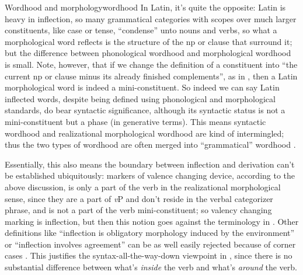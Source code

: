 \documentclass[a4paper, oneside]{report}
\newcommand*{\citesec}[1]{\S~{#1}}
\newcommand{\vP}{\textit{v}P}
\begin{document}
\begin{theorybox}{Wordhood and morphology}{wordhood}
    In Latin, it's quite the opposite: 
    Latin is heavy in inflection, 
    so many grammatical categories with scopes over much larger constituents, 
    like case or tense, 
    ``condense'' unto nouns and verbs, 
    so what a morphological word reflects 
    is the structure of the \acs{np} or clause that surround it;
    but the difference between phonological wordhood 
    and morphological wordhood is small. 
    Note, however, that if we change the definition of a constituent 
    into ``the current \acs{np} or clause minus its already finished complements'',
    as in ,
    then a Latin morphological word is indeed a mini-constituent.
    So indeed we can say Latin inflected words,
    despite being defined using phonological and morphological standards,
    do bear syntactic significance,
    although its syntactic status 
    is not a mini-constituent but a phase (in generative terms).
    This means syntactic wordhood and realizational morphological wordhood
    are kind of intermingled;
    thus the two types of wordhood are often 
    merged into ``grammatical'' wordhood \citet[\citesec{10.4}]{dixon2010basic2}. 

    Essentially, this also means the boundary between inflection and derivation 
    can't be established ubiquitously:
    markers of valence changing device, 
    according to the above discussion,
    is only a part of the verb in the realizational morphological sense, 
    since they are a part of \vP{} and 
    don't reside in the verbal categorizer phrase, 
    and is not a part of the verb mini-constituent;
    so valency changing marking is inflection,
    but then this notion goes against the terminology in \citet{jacques2021grammar}.
    Other definitions like ``inflection is obligatory morphology induced by the environment''
    or ``inflection involves agreement''
    can be as well easily rejected because of corner cases 
    \citep[\citesec{5.3}]{dixon2009basic1}. 
    This justifies the syntax-all-the-way-down viewpoint in 
    ,
    since there is no substantial difference 
    between what's \emph{inside} the verb and what's \emph{around} the verb.


\end{theorybox}
\end{document}
